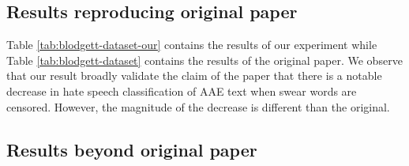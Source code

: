 \subsection{Results reproducing original paper}

Table \ref{tab:blodgett-dataset-our} contains the results of our experiment while Table \ref{tab:blodgett-dataset} contains the results of the original paper. We observe that our result broadly validate the claim of the paper that there is a notable decrease in hate speech classification of AAE text when swear words are censored. However, the magnitude of the decrease is different than the original.

\begin{table}[h]
\centering
\caption{Results from our experiment using Word2Vec model trained on Blodgett}
\label{tab:blodgett-dataset-our}
\end{table}

\begin{table}[h]
\centering
\caption{Results from the original paper}
\label{tab:blodgett-dataset}
\end{table}



\subsection{Results beyond original paper}


